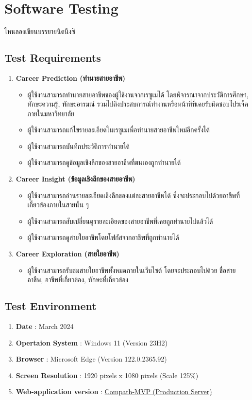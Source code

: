 \section{Software Testing}
ไหนลองเขียนบรรยายนิดนึงซิ
\subsection{Test Requirements}
\begin{enumerate}
    \item \textbf{Career Prediction (ทำนายสายอาชีพ)}
          \begin{itemize}
              \item ผู้ใช้งานสามารถทำนายสายอาชีพของผู้ใช้งานจากเรซูเมได้ โดยพิจารณาจากประวัติการศึกษา, ทักษะความรู้, ทักษะอารมณ์ รวมไปถึงประสบการณ์ทำงานหรือหน้าที่ที่เคยรับผิดชอบโปรเจ็คภายในมหาวิทยาลัย
              \item ผู้ใช้งานสามารถแก้ไขรายละเอียดในเรซูเมเพื่อทำนายสายอาชีพใหม่อีกครั้งได้
              \item ผู้ใช้งานสามารถบันทึกประวัติการทำนายได้
              \item ผู้ใช้งานสามารถดูข้อมูลเชิงลึกของสายอาชีพที่ตนเองถูกทำนายได้
          \end{itemize}
    \item \textbf{Career Insight (ข้อมูลเชิงลึกของสายอาชีพ)}
          \begin{itemize}
              \item ผู้ใช้งานสามารถอ่านรายละเอียดเชิงลึกของแต่ละสายอาชีพได้ ซึ่งจะประกอบไปด้วยอาชีพที่เกี่ยวข้องภายในสายนั้น ๆ
              \item ผู้ใช้งานสามารถสับเปลี่ยนดูรายละเอียดของสายอาชีพที่เคยถูกทำนายไปแล้วได้
              \item ผู้ใช้งานสามารถดูสายใยอาชีพโดยโฟกัสจากอาชีพที่ถูกทำนายได้
          \end{itemize}
    \item \textbf{Career Exploration (สายใยอาชีพ)}
          \begin{itemize}
              \item ผู้ใช้งานสามารถรับชมสายใยอาชีพทั้งหมดภายในเว็บไซต์ โดยจะประกอบไปด้วย ชื่อสายอาชีพ, อาชีพที่เกี่ยวข้อง, ทักษะที่เกี่ยวข้อง
          \end{itemize}
\end{enumerate}
\label{sec:test-subsection}
\subsection{Test Environment}
\begin{enumerate}
    \item \textbf{Date} : March 2024
    \item \textbf{Opertaion System} : Windows 11 (Version 23H2)
    \item \textbf{Browser} : Microsoft Edge (Version 122.0.2365.92)
    \item \textbf{Screen Resolution} : 1920 pixels x 1080 pixels (Scale 125\%)
    \item \textbf{Web-application version} : \href{https://compath-qc72cy7wuq-as.a.run.app/}{Compath-MVP (Production Server)}
\end{enumerate}
